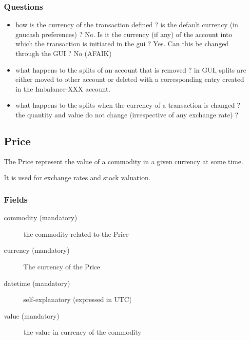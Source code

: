 \documentclass[letterpaper,10pt,english]{sphinxmanual}
\begin{document}
\subsubsection{Questions}
\label{object_model:id8}\begin{itemize}
\item {} 
how is the currency of the transaction defined ? is the default currency (in gnucash preferences) ? No.
Is it the currency (if any) of the account into which the transaction is initiated in the gui ? Yes.
Can this be changed through the GUI ? No (AFAIK)

\item {} 
what happens to the splits of an account that is removed ? in GUI, splits are either moved to other account or deleted
with a corresponding entry created in the Imbalance-XXX account.

\item {} 
what happens to the splits when the currency of a transaction is changed ? the quantity and value do not change
(irrespective of any exchange rate) ?

\end{itemize}


\subsection{Price}
\label{object_model:price}
The Price represent the value of a commodity in a given currency at some time.

It is used for exchange rates and stock valuation.


\subsubsection{Fields}
\label{object_model:id9}\begin{description}
\item[{commodity (mandatory)}] \leavevmode
the commodity related to the Price

\item[{currency (mandatory)}] \leavevmode
The currency of the Price

\item[{datetime (mandatory)}] \leavevmode
self-explanatory (expressed in UTC)

\item[{value (mandatory)}] \leavevmode
the value in currency of the commodity

\end{description}
\end{document}
